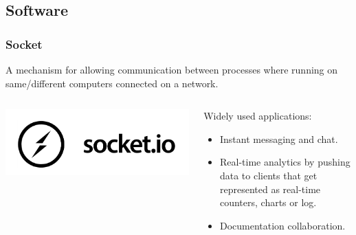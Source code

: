 \documentclass[11pt]{beamer}
\begin{document}
\subsection{Software}
\subsubsection{Socket}
\begin{frame}
  A mechanism for allowing communication between processes where running on same/different computers connected on a network.
  \medskip
\begin{columns}
  \begin{column}{0.55\textwidth}
    \includegraphics[width=\linewidth]{socket.jpg}
  \end{column}
  \begin{column}{0.5\textwidth}
    \small
    
Widely used applications:
\begin{itemize}
  \item Instant messaging and chat.
  \item Real-time analytics by pushing data to clients that get represented as real-time counters, charts or log.
  \item Documentation collaboration. \\
\end{itemize}
  \end{column}
\end{columns}
\end{frame}
\end{document}
